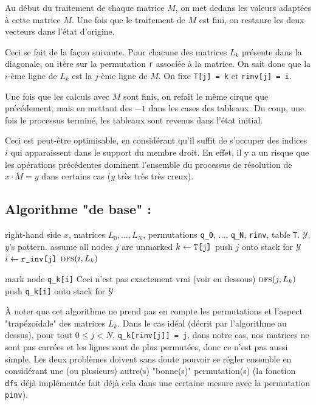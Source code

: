 \documentclass{article}
\begin{document}
Au début du traitement de chaque matrice $M$, on met dedans les
valeurs adaptées à cette matrice $M$. Une fois que le traitement de
$M$ est fini, on restaure les deux vecteurs dans l'état d'origine.

Ceci se fait de la façon suivante.  Pour chacune des matrices $L_k$
présente dans la diagonale, on itère sur la permutation \verb|r|
associée à la matrice. On sait donc que la $i$-ème ligne de $L_k$ est
la $j$-ème ligne de $M$. On fixe \verb|T[j] = k| et \verb|rinv[j] = i|.

Une fois que les calculs avec $M$ sont finis, on refait le même
cirque que précédement, mais en mettant des $-1$ dans les cases des
tableaux. Du coup, une fois le processus terminé, les tableaux sont
revenus dans l'état initial.

Ceci est peut-être optimisable, en considérant qu'il suffit de
s'occuper des indices $i$ qui apparaissent dans le support du membre
droit. En effet, il y a un risque que les opérations précédentes
dominent l'ensemble du processus de résolution de $x \cdot M = y$ dans
certains cas ($y$ très très très creux).

\subsection{Algorithme "de base" :}

\begin{algorithmic}
\Require right-hand side $x$, matrices $L_0, \ldots, L_N$, permutations \verb$q_0$, ..., \verb$q_N$, \verb$rinv$, table \verb$T$.
\Ensure $\mathcal{Y}$, $y$'s pattern.
\State assume all nodes $j$ are unmarked
\State $k \gets \verb|T[j]|$
\State push $j$ onto stack for $\mathcal{Y}$
\Else
\State $i \gets \verb|r_inv[j]|$
\State $\textsc{dfs}(i, L_k)$
\EndIf
\EndIf
\EndFor   
\end{algorithmic}   

\begin{algorithmic}
\State mark node \verb$q_k[i]$ \Comment Ceci n'est pas exactement vrai (voir en dessous)
\State $\textsc{dfs}(j, L_k)$
\EndIf
\State push \verb$q_k[i]$ onto stack for $\mathcal{Y}$
\EndFor
\EndProcedure
\end{algorithmic}

À noter que cet algorithme ne prend pas en compte les permutations et l'aspect "trapézoïdale" des matrices $L_k$.
Dans le cas idéal (décrit par l'algorithme au dessus), pour tout $0 \leq j < N$, \verb$q_k[rinv[j]] = j$, dans notre cas, nos matrices ne sont pas carrées et les lignes sont de plus permutées, donc ce n'est pas aussi simple.
Les deux problèmes doivent sans doute pouvoir se régler ensemble en considérant une (ou plusieurs) autre(s) "bonne(s)" permutation(s) (la fonction \verb$dfs$ déjà implémentée fait déjà cela dans une certaine mesure avec la permutation \verb$pinv$). 
\end{document}
